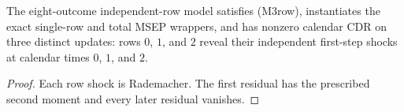 \begin{theorem}\label{thm:cdrWitness}\leanok
{}
The eight-outcome independent-row model satisfies (M3row), instantiates the
exact single-row and total MSEP wrappers, and has nonzero calendar CDR on three
distinct updates: rows $0$, $1$, and $2$ reveal their independent first-step
shocks at calendar times $0$, $1$, and $2$.
\end{theorem}
\begin{proof}\leanok Each row shock is Rademacher. The first residual has the prescribed second moment and every later residual vanishes.\end{proof}
